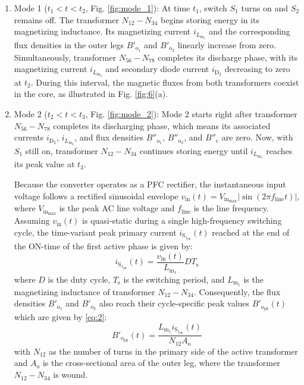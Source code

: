 \documentclass[lettersize,journal]{IEEEtran}
\begin{document}
\begin{enumerate}
    \item Mode 1 ($t_1 < t < t_2$, Fig. \ref{fig:mode_1}): At time $t_1$, switch $S_1$ turns on and $S_2$ remains off. The transformer $N_{12}-N_{34}$ begins storing energy in its magnetizing inductance. Its magnetizing current $i_{L_{\mathrm{m}_1}}$ and the corresponding flux densities in the outer legs $B'_{\mathrm{o}_1}$ and $B'_{\mathrm{o}_2}$ linearly increase from zero. Simultaneously, transformer $N_{56}-N_{78}$ completes its discharge phase, with its magnetizing current $i_{L_{\mathrm{m}_2}}$ and secondary diode current $i_{\mathrm{D}_2}$ decreasing to zero at $t_2$. During this interval, the magnetic fluxes from both transformers coexist in the core, as illustrated in Fig. \ref{fig:6}(a).

    \item Mode 2 ($t_2 < t < t_3$, Fig. \ref{fig:mode_2}): Mode 2 starts right after transformer $N_{56}-N_{78}$ completes its discharging phase, which means its associated currents $i_{\mathrm{D}_2}$, $i_{L_{\mathrm{m}_2}}$, and flux densities $B''_{\mathrm{o}_1}$, $B''_{\mathrm{o}_2}$, and $B''_{\mathrm{c}}$ are zero. Now, with $S_1$ still on, transformer $N_{12}-N_{34}$ continues storing energy until $i_{L_{\mathrm{m}_1}}$ reaches its peak value at $t_3$. 
    
    \vspace{\baselineskip}
    Because the converter operates as a PFC rectifier, the instantaneous input voltage follows a rectified sinusoidal envelope $v_{\mathrm{in}}(t) = V_{\mathrm{in}_{\mathrm{max}}} |\sin(2\pi f_{\mathrm{line}} t)|$, where $V_{\mathrm{in}_{\mathrm{max}}}$ is the peak AC line voltage and $f_{\mathrm{line}}$ is the line frequency. Assuming $v_{\mathrm{in}}(t)$ is quasi-static during a single high-frequency switching cycle, the time-variant peak primary current $i_{\mathrm{S}_{1_{\mathrm{pk}}}}(t)$ reached at the end of the ON-time of the first active phase is given by:
    \begin{equation}
    \label{eq:1}
    i_{\mathrm{S}_{1_{\mathrm{pk}}}}(t) = \frac{v_{\mathrm{in}}(t)}{L_{\mathrm{m}_1}} D T_{\mathrm{s}} 
    \end{equation}
    where $D$ is the duty cycle, $T_{\mathrm{s}}$ is the switching period, and $L_{\mathrm{m}_1}$ is the magnetizing inductance of transformer $N_{12}-N_{34}$. Consequently, the flux densities $B'_{\mathrm{o}_1}$ and $B'_{\mathrm{o}_2}$ also reach their cycle-specific peak values $B'_{\mathrm{o}_{\mathrm{pk}}}(t)$ which are given by \eqref{eq:2}:
    \begin{equation}
    \label{eq:2}
    B'_{\mathrm{o}_{\mathrm{pk}}}(t) = \frac{L_{\mathrm{m}_1} i_{\mathrm{S}_{1_{\mathrm{pk}}}}(t)}{N_{12} A_{\mathrm{o}}} 
    \end{equation}
    with $N_{12}$ as the number of turns in the primary side of the active transformer and $A_{\mathrm{o}}$ is the cross-sectional area of the outer leg, where the transformer $N_{12}-N_{34}$ is wound.


\end{enumerate}
\end{document}
